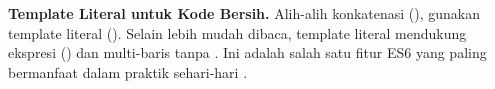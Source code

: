 \begin{catatan}
\textbf{Template Literal untuk Kode Bersih.} Alih-alih konkatenasi (), gunakan template literal (). Selain lebih mudah dibaca, template literal mendukung ekspresi () dan multi-baris tanpa \code{\\n}. Ini adalah salah satu fitur ES6 yang paling bermanfaat dalam praktik sehari-hari \cite{jsInfo}.
\end{catatan}

